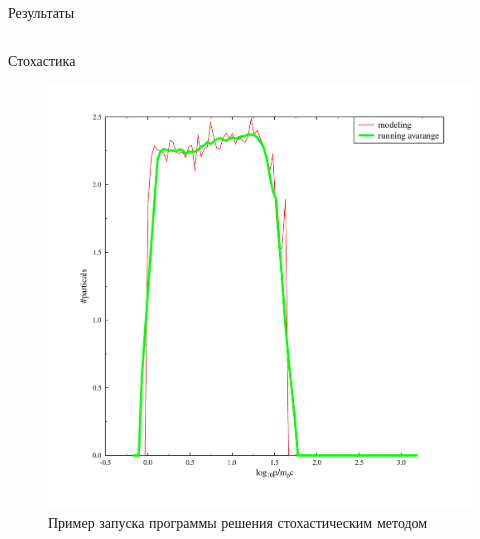 \documentclass[8pt,pdf,hyperref={unicode},serif]{beamer}
\begin{document}
\begin{frame}{Результаты}
\begin{columns}
\begin{column}{0.5\textwidth}
Стохастика
\begin{figure}[H]
\centering
\includegraphics[width=0.90\linewidth]{stoh_bom_one}
\caption{Пример запуска программы решения стохастическим методом}
\end{figure}
\end{column}
\end{columns}
\end{frame}
\end{document}
